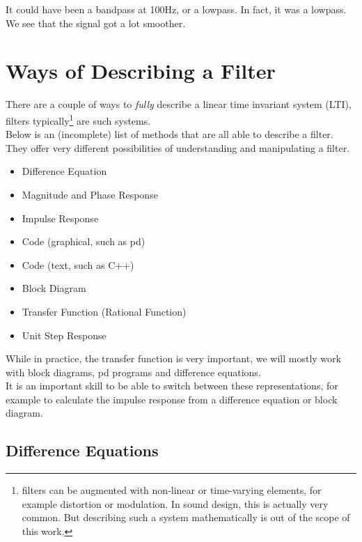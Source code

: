 \begin{Answer}
	It could have been a bandpass at 100Hz, or a lowpass. In fact, it was a lowpass. We see that the signal got a lot smoother.
\end{Answer}

\section{Ways of Describing a Filter}
There are a couple of ways to \textit{fully} describe a linear time invariant system (LTI), filters typically\footnote{filters can be augmented with non-linear or time-varying elements, for example distortion or modulation. In sound design, this is actually very common. But describing such a system mathematically is out of the scope of this work.} are such systems.\\
Below is an (incomplete) list of methods that are all able to describe a filter. They offer very different possibilities of understanding and manipulating a filter.
\begin{itemize}
	\item Difference Equation
	\item Magnitude and Phase Response
	\item Impulse Response
	\item Code (graphical, such as pd)
	\item Code (text, such as C++)
	\item Block Diagram
	\item Transfer Function (Rational Function)
	\item Unit Step Response
\end{itemize}

While in practice, the transfer function is very important, we will mostly work with block diagrams, pd programs and difference equations.\\
It is an important skill to be able to switch between these representations, for example to calculate the impulse response from a difference equation or block diagram.

\subsection{Difference Equations}
\label{sub:diff}

